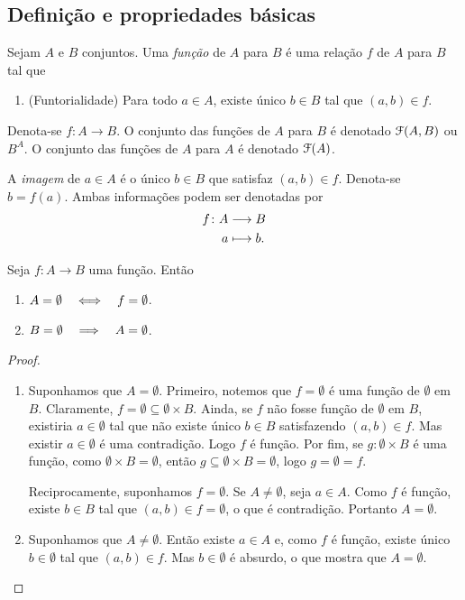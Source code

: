 \subsection{Definição e propriedades básicas}

\begin{definition}
Sejam $A$ e $B$ conjuntos. Uma \emph{função} de $A$ para $B$ é uma relação $f$ de $A$ para $B$ tal que
	\begin{enumerate}
		\item (Funtorialidade) Para todo $a \in A$, existe único $b \in B$ tal que $(a,b) \in f$.
	\end{enumerate}
Denota-se $f: A \to B$. O conjunto das funções de $A$ para $B$ é denotado $\mathcal{F}(A,B)$ ou $B^A$. O conjunto das funções de $A$ para $A$ é denotado $\mathcal{F}(A)$.

A \emph{imagem} de $a \in A$ é o único $b \in B$ que satisfaz $(a,b) \in f$. Denota-se $b=f(a)$. Ambas informações podem ser denotadas por
	\begin{align*}
	{f}\colon {A} &\longrightarrow {B} \\{a} &\longmapsto b.
	\end{align*}

\end{definition}

\begin{proposition}
Seja $f: A \to B$ uma função. Então
	\begin{enumerate}
	\item $A=\emptyset \quad \Longleftrightarrow \quad f=\emptyset$.
	\item $B=\emptyset \quad \Longrightarrow \quad A=\emptyset$.
	\end{enumerate}
\end{proposition}
\begin{proof}
	\begin{enumerate}
	\item Suponhamos que $A=\emptyset$. Primeiro, notemos que $f=\emptyset$ é uma função de $\emptyset$ em $B$. Claramente, $f = \emptyset \subseteq \emptyset \times B$. Ainda, se $f$ não fosse função de $\emptyset$ em $B$, existiria $a \in \emptyset$ tal que não existe único $b \in B$ satisfazendo $(a,b) \in f$. Mas existir $a \in \emptyset$ é uma contradição. Logo $f$ é função. Por fim, se $g: \emptyset \times B$ é uma função, como $\emptyset \times B = \emptyset$, então $g \subseteq \emptyset \times B = \emptyset$, logo $g=\emptyset=f$.
	
Reciprocamente, suponhamos $f=\emptyset$. Se $A \neq \emptyset$, seja $a \in A$. Como $f$ é função, existe $b \in B$ tal que $(a,b) \in f=\emptyset$, o que é contradição. Portanto $A=\emptyset$.
	
	\item Suponhamos que $A \neq \emptyset$. Então existe $a \in A$ e, como $f$ é função, existe único $b \in \emptyset$ tal que $(a,b) \in f$. Mas $b \in \emptyset$ é absurdo, o que mostra que $A = \emptyset$.
	\end{enumerate}
\end{proof}

